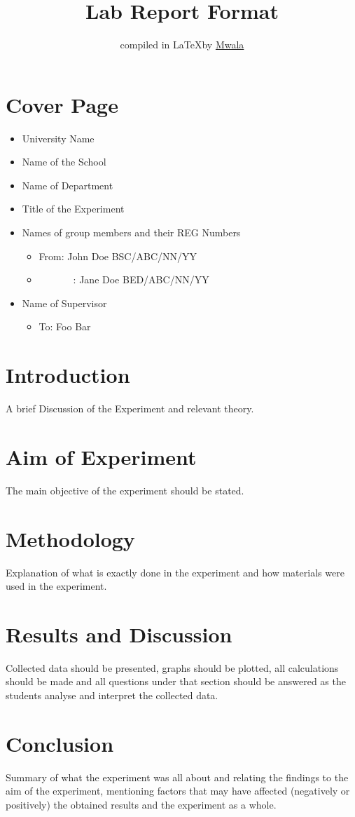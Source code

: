 \documentclass[12pt]{article}
\title{Lab Report Format}
\author{compiled in \LaTeX \nobreakspace by \href{https://bento.me/joelmwala}{Mwala}}
\begin{document}
\maketitle
\section*{Cover Page}
\begin{itemize}
    \item University Name
    \item Name of the School
    \item Name of Department
    \item Title of the Experiment
    \item Names of group members and their REG Numbers
          \begin{itemize}[label= {}]
              \item From: John Doe BSC/ABC/NN/YY
              \item ~~~~~~~: Jane Doe BED/ABC/NN/YY
          \end{itemize}
    \item Name of Supervisor
          \begin{itemize}[label={}]
              \item To: Foo Bar
          \end{itemize}

\end{itemize}

\section*{Introduction}
A brief Discussion of the Experiment and relevant theory.

\section*{Aim of Experiment}
The main objective of the experiment should be stated.

\section*{Methodology}
Explanation of what is exactly done in the experiment and how materials were used in the experiment.

\section*{Results and Discussion}
Collected data should be presented, graphs should be plotted, all calculations should be made and all questions under that section should be answered as the students analyse and interpret the collected data.

\section*{Conclusion}
Summary of what the experiment was all about and relating the findings to the aim of the experiment, mentioning factors that may have affected (negatively or positively) the obtained results and the experiment as a whole.
\end{document}
